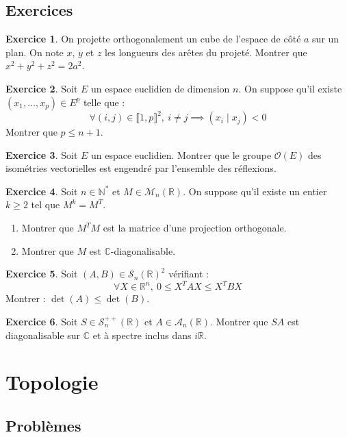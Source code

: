 \documentclass[french]{book}
\newcommand{\N}{\mathbb{N}}
\newcommand{\R}{\mathbb{R}}
\newcommand{\C}{\mathbb{C}}
\newcommand{\st}{^*}
\theoremstyle{definition}
\newtheorem{ex}{Exercice}[chapter]
\begin{document}
\section{Exercices}

\begin{ex}
	On projette orthogonalement un cube de l'espace de côté $a$ sur un plan. On note $x$, $y$ et $z$ les longueurs des arêtes du projeté. Montrer que $x^2+y^2+z^2=2a^2$.
\end{ex}

\begin{ex}
	Soit $E$ un espace euclidien de dimension $n$. On suppose qu'il existe $(x_1,\ldots,x_p)\in E^{p}$ telle que : $$\forall (i,j)\in\llbracket1,p\rrbracket^2,\ i\ne j\implies (x_i\mid x_j)<0$$ Montrer que $p\leqslant n+1$.
\end{ex}

\begin{ex}
	Soit $E$ un espace euclidien. Montrer que le groupe $\mathcal{O}(E)$ des isométries vectorielles est engendré par l'ensemble des réflexions.
\end{ex}

\begin{ex}
	Soit $n\in\N\st$ et $M\in\mathcal{M}_n(\R)$. On suppose qu'il existe un entier $k\geqslant 2$ tel que $M^k=M^T$.
	\begin{enumerate}
		\item Montrer que $M^TM$ est la matrice d'une projection orthogonale.
		\item Montrer que $M$ est $\C$-diagonalisable.
	\end{enumerate}
\end{ex}

\begin{ex}
	Soit $(A,B)\in\mathcal{S}_n(\R)^2$ vérifiant : $$\forall X\in\R^n,\ 0\leqslant X^TAX\leqslant X^TBX$$ Montrer : $\det(A)\leqslant\det(B)$.
\end{ex}

\begin{ex}
	Soit $S\in\mathcal{S}_n^{++}(\R)$ et $A\in\mathcal{A}_n(\R)$. Montrer que $SA$ est diagonalisable sur $\C$ et à spectre inclus dans $i\R$.
\end{ex}

\chapter{Topologie}

\section{Problèmes}
\end{document}
